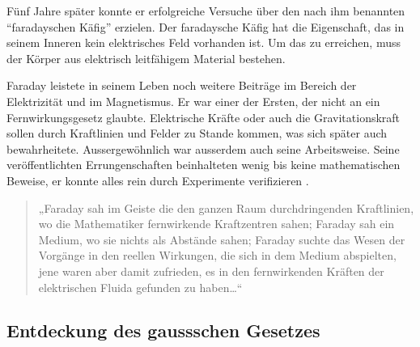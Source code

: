 Fünf Jahre später konnte er erfolgreiche Versuche über den nach ihm benannten ``faradayschen Käfig'' erzielen.
Der faradaysche Käfig hat die Eigenschaft, das in seinem Inneren kein elektrisches Feld vorhanden ist.
Um das zu erreichen, muss der Körper aus elektrisch leitfähigem Material bestehen.

Faraday leistete in seinem Leben noch weitere Beiträge im Bereich der Elektrizität und im Magnetismus. 
Er war einer der Ersten, der nicht an ein Fernwirkungsgesetz glaubte.
Elektrische Kräfte oder auch die Gravitationskraft sollen durch Kraftlinien und Felder zu Stande kommen, was sich später auch bewahrheitete.
Aussergewöhnlich war ausserdem auch seine Arbeitsweise.
Seine veröffentlichten Errungenschaften beinhalteten wenig bis keine mathematischen Beweise, er konnte alles rein durch Experimente verifizieren \cite{maxwell:Michael_Faraday}.
\begin{quote}
	„Faraday sah im Geiste die den ganzen Raum durchdringenden Kraftlinien, wo die Mathematiker fernwirkende Kraftzentren sahen; Faraday sah ein Medium, wo sie nichts als Abstände sahen; Faraday suchte das Wesen der Vorgänge in den reellen Wirkungen, die sich in dem Medium abspielten, jene waren aber damit zufrieden, es in den fernwirkenden Kräften der elektrischen Fluida gefunden zu haben…“ \cite{maxwell:zitat}
\end{quote}

\subsection{Entdeckung des gaussschen Gesetzes}

